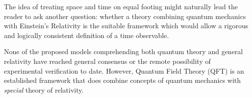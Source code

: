 The idea of treating space and time on equal footing might naturally lead the reader to
ask another question: whether a theory combining quantum mechanics with Einstein's
Relativity is the suitable framework which would allow a rigorous and logically consistent
definition of a time observable.

None of the proposed models comprehending both quantum theory and general relativity
have reached general consensus or the remote possibility of experimental verification to date.
However, Quantum Field Theory (QFT) is an established framework that does combine
concepts of quantum mechanics with \emph{special} theory of relativity.
